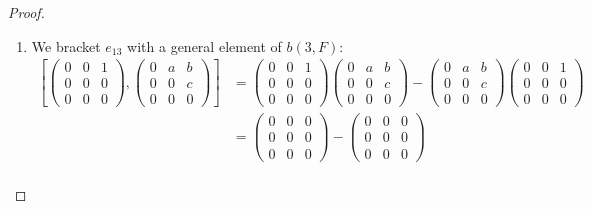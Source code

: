 \documentclass[12pt]{article}
\theoremstyle{definition}
\begin{document}
\begin{proof}
\begin{enumerate}[label=(\alph*)]
\begin{align*}
			                       & = \begin{pmatrix}0 & 0 & 1 \\ 0 & 0 & 0 \\ 0 & 0 & 0\end{pmatrix}                                                                                                                                                                                                 \\
			                       & = e_{13}.
		      \end{align*}
		\item We bracket $e_{13}$ with a general element of $b(3, F)$: \begin{align*}
			      \left[ \begin{pmatrix}0 & 0 & 1 \\ 0 & 0 & 0 \\ 0 & 0 & 0\end{pmatrix}, \begin{pmatrix}0 & a & b \\ 0 & 0 & c \\ 0 & 0 & 0\end{pmatrix} \right] & = \begin{pmatrix}0 & 0 & 1 \\ 0 & 0 & 0 \\ 0 & 0 & 0\end{pmatrix}\begin{pmatrix}0 & a & b \\ 0 & 0 & c \\ 0 & 0 & 0\end{pmatrix} - \begin{pmatrix}0 & a & b \\ 0 & 0 & c \\ 0 & 0 & 0\end{pmatrix}\begin{pmatrix}0 & 0 & 1 \\ 0 & 0 & 0 \\ 0 & 0 & 0\end{pmatrix} \\
			                                                                                                                                                      & = \begin{pmatrix}0 & 0 & 0 \\ 0 & 0 & 0 \\ 0 & 0 & 0\end{pmatrix} - \begin{pmatrix}0 & 0 & 0 \\ 0 & 0 & 0 \\ 0 & 0 & 0 \end{pmatrix}                                                                                                                              \\

\end{align*}
\end{enumerate}
\end{proof}
\end{document}
